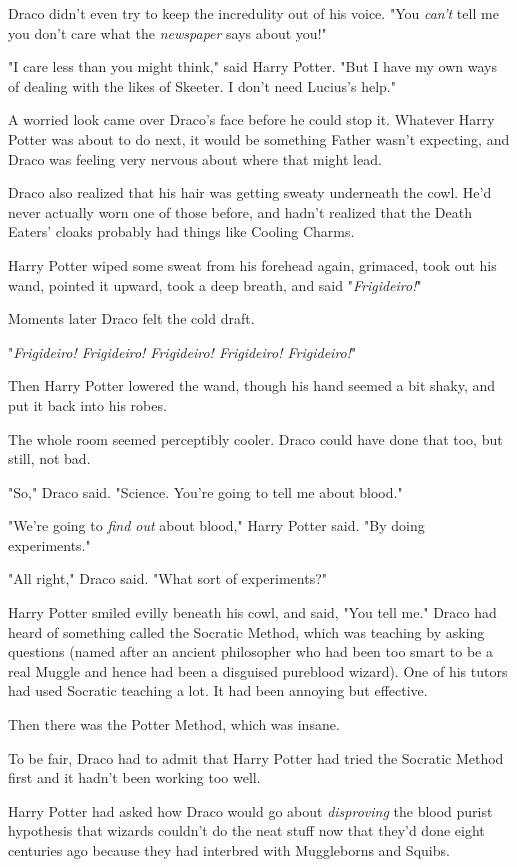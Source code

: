 Draco didn't even try to keep the incredulity out of his voice. "You 
\emph{can't} tell me you don't care what the \emph{newspaper} says about you!"

"I care less than you might think," said Harry Potter. "But I have my own ways 
of dealing with the likes of Skeeter. I don't need Lucius's help."

A worried look came over Draco's face before he could stop it. Whatever Harry 
Potter was about to do next, it would be something Father wasn't expecting, and 
Draco was feeling very nervous about where that might lead.

Draco also realized that his hair was getting sweaty underneath the cowl. He'd 
never actually worn one of those before, and hadn't realized that the Death 
Eaters' cloaks probably had things like Cooling Charms.

Harry Potter wiped some sweat from his forehead again, grimaced, took out his 
wand, pointed it upward, took a deep breath, and said "\emph{Frigideiro!}"

Moments later Draco felt the cold draft.

"\emph{Frigideiro! Frigideiro! Frigideiro! Frigideiro! Frigideiro!}"

Then Harry Potter lowered the wand, though his hand seemed a bit shaky, and put 
it back into his robes.

The whole room seemed perceptibly cooler. Draco could have done that too, but 
still, not bad.

"So," Draco said. "Science. You're going to tell me about blood."

"We're going to \emph{find out} about blood," Harry Potter said. "By doing 
experiments."

"All right," Draco said. "What sort of experiments?"

Harry Potter smiled evilly beneath his cowl, and said, "You tell me."
\sbreak
Draco had heard of something called the Socratic Method, which was teaching by 
asking questions (named after an ancient philosopher who had been too smart to 
be a real Muggle and hence had been a disguised pureblood wizard). One of his 
tutors had used Socratic teaching a lot. It had been annoying but effective.

Then there was the Potter Method, which was insane.

To be fair, Draco had to admit that Harry Potter had tried the Socratic Method 
first and it hadn't been working too well.

Harry Potter had asked how Draco would go about \emph{disproving} the blood 
purist hypothesis that wizards couldn't do the neat stuff now that they'd done 
eight centuries ago because they had interbred with Muggleborns and Squibs.

